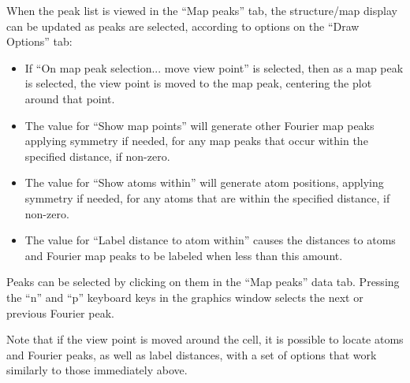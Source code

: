 When the peak list is viewed in the ``Map peaks'' tab, the structure/map display can be updated as peaks are selected, according to options on the  ``Draw Options'' tab:
\begin{itemize}
    \item If ``On map peak selection... move view point'' is selected, then as a map peak is selected, the view point is moved to the map peak, centering the plot around that point.
    \item The value for ``Show map points'' will generate other Fourier map peaks applying symmetry if needed, for any map peaks that occur within the specified distance, if non-zero.  
    \item The value for ``Show atoms within'' will generate atom positions, applying symmetry if needed, for any atoms that are within the specified distance, if non-zero.
    \item   The value for ``Label distance to atom within'' causes the distances to atoms and Fourier map peaks to be labeled when less than this amount. 
\end{itemize}
Peaks can be selected by clicking on them in the ``Map peaks'' data tab. Pressing the ``n'' and ``p'' keyboard keys in the graphics window selects the next or previous Fourier peak. 

Note that if the view point is moved around the cell, it is possible to locate atoms and Fourier peaks, as well as label distances, with a set of options that work similarly to those immediately above. 

